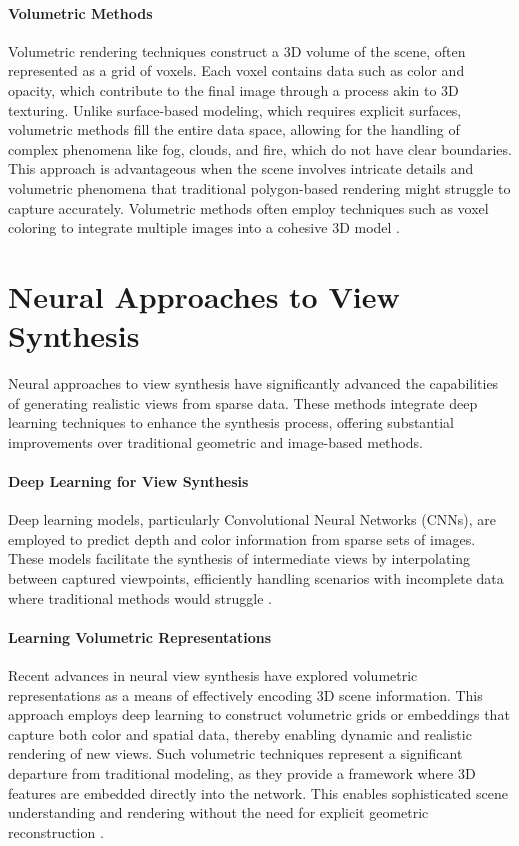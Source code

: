 \paragraph{Volumetric Methods}
Volumetric rendering techniques construct a 3D volume of the scene, often represented as a grid of voxels. Each voxel contains data such as color and opacity, which contribute to the final image through a process akin to 3D texturing. Unlike surface-based modeling, which requires explicit surfaces, volumetric methods fill the entire data space, allowing for the handling of complex phenomena like fog, clouds, and fire, which do not have clear boundaries.
This approach is advantageous when the scene involves intricate details and volumetric phenomena that traditional polygon-based rendering might struggle to capture accurately. Volumetric methods often employ techniques such as voxel coloring to integrate multiple images into a cohesive 3D model \cite{curless_volumetric_1996,seitz_photorealistic_1999}.


\section{Neural Approaches to View Synthesis}
Neural approaches to view synthesis have significantly advanced the capabilities of generating realistic views from sparse data.
These methods integrate deep learning techniques to enhance the synthesis process, offering substantial improvements over traditional geometric and image-based methods.

\paragraph{Deep Learning for View Synthesis}
Deep learning models, particularly Convolutional Neural Networks (CNNs), are employed to predict depth and color information from sparse sets of images.
These models facilitate the synthesis of intermediate views by interpolating between captured viewpoints, efficiently handling scenarios with incomplete data where traditional methods would struggle \cite{kalantari_learning-based_2016,maxim_tatarchenko_single-view_2015,peter_hedman_deep_2019}.

\paragraph{Learning Volumetric Representations}
Recent advances in neural view synthesis have explored volumetric representations as a means of effectively encoding 3D scene information.
This approach employs deep learning to construct volumetric grids or embeddings that capture both color and spatial data, thereby enabling dynamic and realistic rendering of new views.
Such volumetric techniques represent a significant departure from traditional modeling, as they provide a framework where 3D features are embedded directly into the network. This enables sophisticated scene understanding and rendering without the need for explicit geometric reconstruction \cite{lombardi_neural_2019,sitzmann_deepvoxels_2019}.

